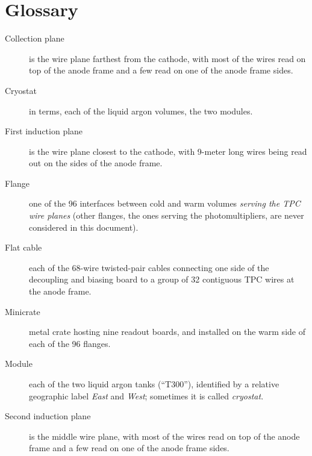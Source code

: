 \section{Glossary}
\label{sec:glossary}

\begin{description}
  \item[Collection plane] is the wire plane farthest from the cathode,
    with most of the wires read on top of the anode frame and a few read on one
    of the anode frame sides.
  \item[Cryostat] in \LArSoft terms, each of the liquid argon volumes, \ie the
    two modules.
  \item[First induction plane] is the wire plane closest to the cathode,
    with 9-meter long wires being read out on the sides of the anode frame.
  \item[Flange] one of the 96 interfaces between cold and warm volumes
    \emph{serving the TPC wire planes}
    (other flanges, \eg the ones serving the photomultipliers, are never
    considered in this document).
  \item[Flat cable] each of the 68-wire twisted-pair cables connecting one side
    of the decoupling and biasing board to a group of 32 contiguous TPC wires
    at the anode frame.
  \item[Minicrate] metal crate hosting nine readout boards,
    and installed on the warm side of each of the 96 flanges.
  \item[Module] each of the two liquid argon tanks (``T300''), identified by
    a relative geographic label \emph{East} and \emph{West}; sometimes it is
    called \emph{cryostat}.
  \item[Second induction plane] is the middle wire plane,
    with most of the wires read on top of the anode frame and a few read on one
    of the anode frame sides.
\end{description}
